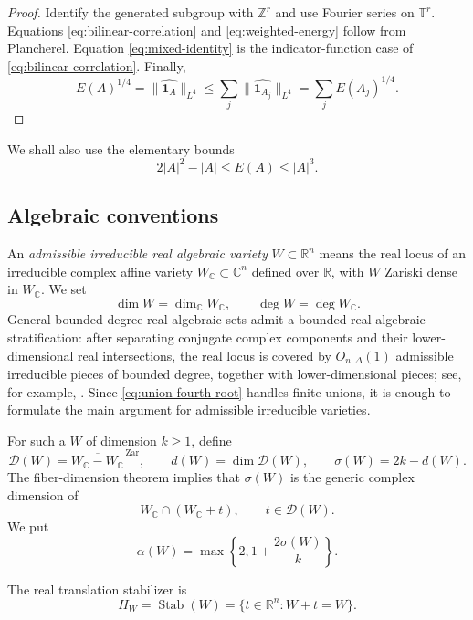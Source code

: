 \documentclass[11pt]{amsart}
\numberwithin{equation}{section}
\theoremstyle{definition}
\theoremstyle{remark}
\newcommand{\R}{\mathbb R}
\newcommand{\C}{\mathbb C}
\newcommand{\Z}{\mathbb Z}
\newcommand{\T}{\mathbb T}
\newcommand{\cD}{\mathcal D}
\newcommand{\Stab}{\operatorname{Stab}}
\newcommand{\1}{\mathbf 1}
\newcommand{\card}[1]{\lvert #1\rvert}
\newcommand{\norm}[2][]{\lVert #2\rVert_{#1}}
\begin{document}
\begin{proof}
Identify the generated subgroup with $\Z^r$ and use Fourier series on $\T^r$.  Equations \eqref{eq:bilinear-correlation} and \eqref{eq:weighted-energy} follow from Plancherel.  Equation \eqref{eq:mixed-identity} is the indicator-function case of \eqref{eq:bilinear-correlation}.  Finally,
\[
 E(A)^{1/4}=\norm[L^4]{\widehat{\1_A}}
 \leq\sum_j\norm[L^4]{\widehat{\1_{A_j}}}
 =\sum_j E(A_j)^{1/4}.
\]
\end{proof}

We shall also use the elementary bounds
\begin{equation}\label{eq:energy-universal}
 2\card A^2-\card A\leq E(A)\leq\card A^3.
\end{equation}

\subsection{Algebraic conventions}\label{sec:algebraic-preliminaries}
An \emph{admissible irreducible real algebraic variety} $W\subset\R^n$ means the real locus of an irreducible complex affine variety $W_{\C}\subset\C^n$ defined over $\R$, with $W$ Zariski dense in $W_{\C}$.  We set
\[
 \dim W=\dim_{\C}W_{\C},
 \qquad
 \deg W=\deg W_{\C}.
\]
General bounded-degree real algebraic sets admit a bounded real-algebraic stratification: after separating conjugate complex components and their lower-dimensional real intersections, the real locus is covered by $O_{n,\Delta}(1)$ admissible irreducible pieces of bounded degree, together with lower-dimensional pieces; see, for example, \cite{BPR}.  Since \eqref{eq:union-fourth-root} handles finite unions, it is enough to formulate the main argument for admissible irreducible varieties.

For such a $W$ of dimension $k\geq1$, define
\begin{equation}\label{eq:difference-variety}
 \cD(W)=\overline{W_{\C}-W_{\C}}^{\,\mathrm{Zar}},
 \qquad
 d(W)=\dim\cD(W),
 \qquad
 \sigma(W)=2k-d(W).
\end{equation}
The fiber-dimension theorem implies that $\sigma(W)$ is the generic complex dimension of
\[
 W_{\C}\cap(W_{\C}+t),
 \qquad t\in\cD(W).
\]
We put
\begin{equation}\label{eq:alpha-W}
 \alpha(W)=\max\left\{2,1+\frac{2\sigma(W)}k\right\}.
\end{equation}

The real translation stabilizer is
\begin{equation}\label{eq:stabilizer}
 H_W=\Stab(W)=\{t\in\R^n:W+t=W\}.
\end{equation}
\end{document}
